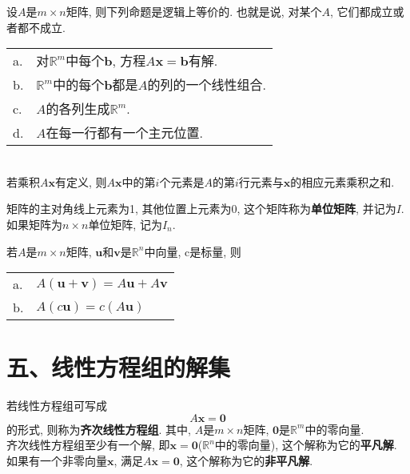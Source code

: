 \begin{theorem}
设$A$是$m\times n$矩阵, 则下列命题是逻辑上等价的. 也就是说, 对某个$A$, 它们都成立或者都不成立.\\
\begin{tabular}{l@{\,}l}
a. & 对$\mathbb{R}^m$中每个$\bm{b}$, 方程$A\bm{x}=\bm{b}$有解.\\
b. & $\mathbb{R}^m$中的每个$\bm{b}$都是$A$的列的一个线性组合.\\
c. & $A$的各列生成$\mathbb{R}^m$.\\
d. & $A$在每一行都有一个主元位置.\\[2ex]
\end{tabular}
\end{theorem}\vspace{2ex}

\begin{law}[计算$A\bm{x}$的行---向量规则]\ \\
若乘积$A\bm{x}$有定义, 则$A\bm{x}$中的第$i$个元素是$A$的第$i$行元素与$\bm{x}$的相应元素乘积之和.
\end{law}\vspace{2ex}

矩阵的主对角线上元素为1, 其他位置上元素为0, 这个矩阵称为\textbf{单位矩阵}, 并记为$I$.\\
如果矩阵为$n\times n$单位矩阵, 记为$I_n$.\\[2ex]

\begin{theorem}
若$A$是$m\times n$矩阵, $\bm{u}$和$\bm{v}$是$\mathbb{R}^n$中向量, c是标量, 则\\
\begin{tabular}{l@{\,}l}
a. & $A(\bm{u}+\bm{v})=A\bm{u}+A\bm{v}$\\
b. & $A(c\bm{u})=c(A\bm{u})$
\end{tabular}
\end{theorem}\vspace{6ex}

\section{五、线性方程组的解集}
若线性方程组可写成
\[A\bm{x}=\bm{0}\]
的形式, 则称为\textbf{齐次线性方程组}. 其中, $A$是$m\times n$矩阵, $\bm{0}$是$\mathbb{R}^m$中的零向量.\\
齐次线性方程组至少有一个解, 即$\bm{x}=\bm{0}$($\mathbb{R}^n$中的零向量), 这个解称为它的\textbf{平凡解}.\\
如果有一个非零向量$\bm{x}$, 满足$A\bm{x}=\bm{0}$, 这个解称为它的\textbf{非平凡解}.\\[2ex]

